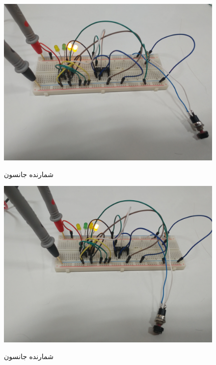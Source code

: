 \documentclass[twoside]{article}
\begin{document}
	\begin{figure}[h!]
		\begin{center}
			\includegraphics[scale=0.05]{j7}‎
			\caption{شمارنده جانسون}
		\end{center}
	\end{figure} 
	
	\begin{figure}[h!]
		\begin{center}
			\includegraphics[scale=0.05]{j8}‎
			\caption{شمارنده جانسون}
		\end{center}
	\end{figure} 

	
\end{document}
